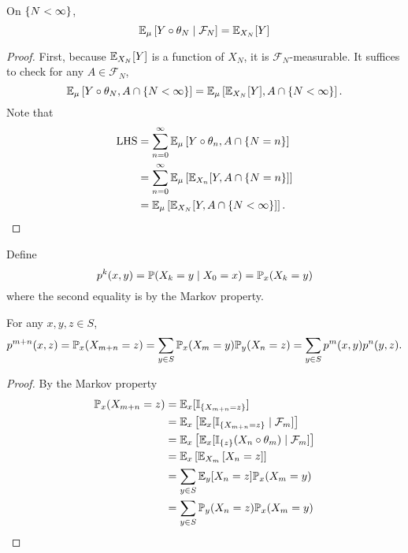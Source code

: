 \begin{thm}
    On $\left\{N < \infty\right\}$,
    \begin{equation*}
        \mathbb{E}_\mu\left[Y \circ \theta_N \mid \mathcal{F}_N\right] = \mathbb{E}_{X_N}[Y]
    \end{equation*}
\end{thm}
\begin{proof}
    First, because $\mathbb{E}_{X_N}[Y]$ is a function of $X_N$, it is $\mathcal{F}_N$-measurable. It suffices to check for any $A \in \mathcal{F}_N$,
    \begin{equation*}
        \mathbb{E}_\mu\left[Y \circ \theta_N , A \cap \left\{N < \infty\right\}\right] = \mathbb{E}_\mu\left[\mathbb{E}_{X_N}[Y] , A \cap \left\{N < \infty\right\}\right].
    \end{equation*}
    Note that
    \begin{equation*}
        \begin{aligned}
            \text{LHS} &= \sum_{n=0}^\infty \mathbb{E}_\mu\left[Y \circ \theta_n , A \cap \left\{N = n\right\}\right] \\
            &= \sum_{n=0}^\infty \mathbb{E}_\mu\left[\mathbb{E}_{X_n}[Y, A \cap \left\{N = n\right\}]\right] \\
            &= \mathbb{E}_\mu\left[\mathbb{E}_{X_N}[Y, A \cap \left\{N < \infty\right\}]\right].
        \end{aligned} \qedhere
    \end{equation*}
\end{proof}

\noindent Define
\begin{equation*}
    p^k(x,y) = \mathbb{P}(X_k = y \mid X_0 = x) = \mathbb{P}_x(X_k = y)
\end{equation*}
where the second equality is by the Markov property.

\begin{thm}
    For any $x,y,z \in S$,
    \begin{equation*}
        p^{m+n}(x,z) = \mathbb{P}_x(X_{m+n} = z) = \sum_{y \in S}\mathbb{P}_x(X_m = y)\mathbb{P}_y(X_n = z) = \sum_{y \in S}p^m(x,y)p^n(y,z).
    \end{equation*}
\end{thm}
\begin{proof}
    By the Markov property
    \begin{equation*}
        \begin{aligned}
            \mathbb{P}_x(X_{m+n} = z) &= \mathbb{E}_x[\mathbb{I}_{\left\{X_{m+n} = z\right\}}]\\
            &=\mathbb{E}_x\left[ \mathbb{E}_x[\mathbb{I}_{\left\{X_{m+n} = z\right\}} \mid \mathcal{F}_m] \right]\\
            &= \mathbb{E}_x\left[ \mathbb{E}_x[\mathbb{I}_{\left\{z\right\}}(X_{n} \circ  \theta_m) \mid \mathcal{F}_m] \right]\\
            &= \mathbb{E}_x\left[\mathbb{E}_{X_m}\left[X_n = z\right]\right] \\
            &= \sum_{y \in S} \mathbb{E}_y[X_n = z] \mathbb{P}_x(X_m = y) \\
            &= \sum_{y \in S} \mathbb{P}_y(X_n = z)\mathbb{P}_x(X_m = y) 
        \end{aligned}\qedhere
    \end{equation*}
\end{proof}

